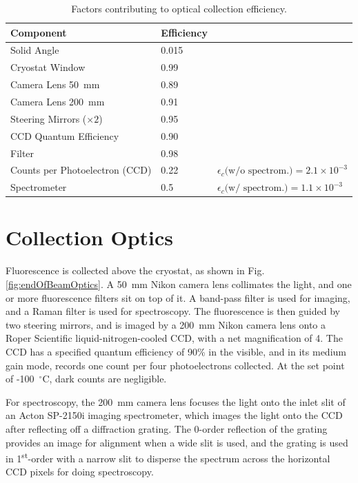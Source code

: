 

\begin{table} [!htbp]
\caption{Factors contributing to optical collection efficiency.}
\label{table:colleff}
\begin{tabular}{l l l}
Component & Efficiency & \\
\hline
Solid Angle & 0.015 & \\
Cryostat Window & 0.99 & \\
Camera Lens 50~mm & 0.89 & \\
Camera Lens 200~mm & 0.91 & \\
Steering Mirrors ($\times 2$) & 0.95 & \\
CCD Quantum Efficiency & 0.90 & \\
Filter & 0.98 & \\
Counts per Photoelectron (CCD) & 0.22 & $\epsilon_{c}\text{(w/o spectrom.)} = 2.1 \times 10^{-3}$\\
\hline
Spectrometer & 0.5 & $\epsilon_{c}\text{(w/ spectrom.)} = 1.1 \times 10^{-3}$\\
\end{tabular}
\end{table}

\section{Collection Optics}
\label{sec:collection}

Fluorescence is collected above the cryostat, as shown in Fig. \ref{fig:endOfBeamOptics}.  A 50~mm Nikon camera lens collimates the light, and one or more fluorescence filters sit on top of it.  A band-pass filter is used for imaging, and a Raman filter is used for spectroscopy.  The fluorescence is then guided by two steering mirrors, and is imaged by a 200~mm Nikon camera lens onto a Roper Scientific liquid-nitrogen-cooled CCD, with a net magnification of 4.  The CCD has a specified quantum efficiency of 90\% in the visible, and in its medium gain mode, records one count per four photoelectrons collected.  At the set point of -100~$^{\circ}$C, dark counts are negligible.

For spectroscopy, the 200~mm camera lens focuses the light onto the inlet slit of an Acton SP-2150i imaging spectrometer, which images the light onto the CCD after reflecting off a diffraction grating.  The 0-order reflection of the grating provides an image for alignment when a wide slit is used, and the grating is used in 1\textsuperscript{st}-order with a narrow slit to disperse the spectrum across the horizontal CCD pixels for doing spectroscopy.

